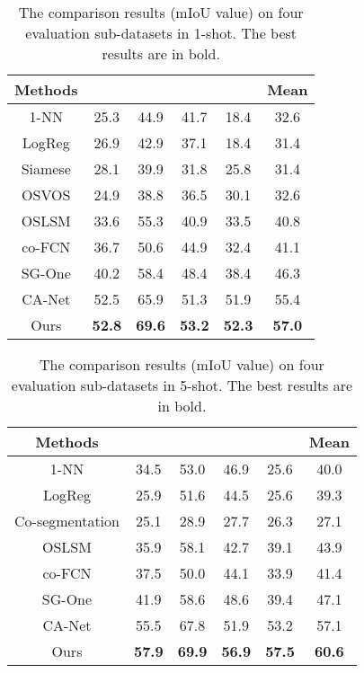 \documentclass[runningheads]{llncs}
\begin{document}
\begin{table}[htp]
        \centering
        \caption{The comparison results (mIoU value) on four evaluation sub-datasets in 1-shot. The best results are in bold.}
\label{table_1shot_miou}
        \begin{tabular}{|c|cccc|c|}
                \hline
               Methods&&&&&Mean\\
               \hline
1-NN & 25.3& 44.9& 41.7& 18.4& 32.6 \\
                LogReg& 26.9& 42.9& 37.1& 18.4& 31.4\\
                Siamese& 28.1& 39.9& 31.8& 25.8& 31.4\\
                OSVOS\cite{ref_vdieo}& 24.9& 38.8& 36.5& 30.1& 32.6\\
                OSLSM\cite{ref_first_one}& 33.6& 55.3& 40.9& 33.5& 40.8\\
                co-FCN\cite{ref_conditional}& 36.7& 50.6& 44.9& 32.4& 41.1\\
                SG-One\cite{ref_sgone}&40.2 &58.4 &48.4 &38.4 &46.3\\
                CA-Net\cite{ref_cvpr}&52.5 &65.9 &51.3 &51.9 &55.4\\
                Ours& \bfseries{52.8}& \bfseries{69.6}& \bfseries{53.2}& \bfseries{52.3}& \bfseries{57.0}\\
                \hline
        \end{tabular}
\end{table}

\begin{table}[htp]
        \centering
        \caption{The comparison results (mIoU value) on four evaluation sub-datasets in 5-shot. The best results are in bold.}
\label{table_5shot_miou}
        \begin{tabular}{|c|cccc|c|}
                \hline
               
               Methods&&&&&Mean\\
               \hline
1-NN & 34.5& 53.0& 46.9& 25.6& 40.0 \\
                LogReg& 25.9& 51.6& 44.5& 25.6& 39.3\\
                Co-segmentation\cite{ref_coseg}& 25.1& 28.9& 27.7& 26.3& 27.1\\
               
                OSLSM\cite{ref_first_one}& 35.9& 58.1& 42.7& 39.1& 43.9\\
                co-FCN\cite{ref_conditional}& 37.5& 50.0& 44.1& 33.9& 41.4\\
                SG-One\cite{ref_sgone}&41.9 &58.6 &48.6 &39.4 &47.1\\
                CA-Net\cite{ref_cvpr}&55.5 &67.8 &51.9 &53.2 &57.1\\
                Ours& \bfseries{57.9}& \bfseries{69.9}& \bfseries{56.9}& \bfseries{57.5}& \bfseries{60.6}\\
                \hline
        \end{tabular}
\end{table}
\end{document}
